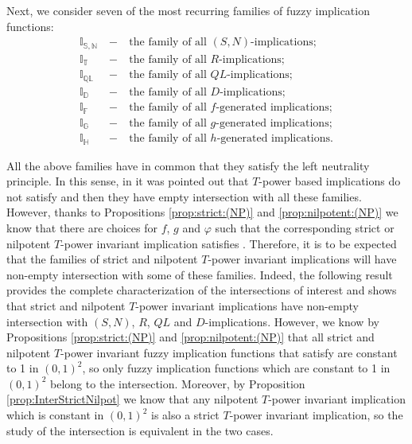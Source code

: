 Next, we consider seven of the most recurring families of fuzzy implication functions:
\begin{eqnarray*}
	\mathbb{I}_{\mathbb{S},\mathbb{N}} &~-~& \text{the family of all $(S,N)$-implications};\\
	\mathbb{I}_{\mathbb{T}} &~-~& \text{the family of all $R$-implications};\\
	\mathbb{I}_{\mathbb{QL}} &~-~& \text{the family of all $QL$-implications};\\
	\mathbb{I}_{\mathbb{D}} &~-~& \text{the family of all $D$-implications};\\
	\mathbb{I}_{\mathbb{F}} &~-~& \text{the family of all $f$-generated implications};\\
	\mathbb{I}_{\mathbb{G}} &~-~& \text{the family of all $g$-generated implications};\\
	\mathbb{I}_{\mathbb{H}} &~-~& \text{the family of all $h$-generated implications}.
\end{eqnarray*}

All the above families have in common that they satisfy the left neutrality principle. In this sense, in \cite{Massanet2017} it was pointed out that $T$-power based implications do not satisfy \NP and then they have empty intersection with all these families. However, thanks to Propositions \ref{prop:strict:(NP)} and \ref{prop:nilpotent:(NP)} we know that there are choices for $f$, $g$ and $\varphi$ such that the corresponding strict or nilpotent $T$-power invariant implication satisfies \NP. Therefore, it is to be expected that the families of strict and nilpotent $T$-power invariant implications will have non-empty intersection with some of these families.  Indeed, the following result provides the complete characterization of the intersections of interest and shows that strict and nilpotent $T$-power invariant implications have non-empty intersection with $(S,N)$, $R$, $QL$ and $D$-implications. However, we know by Propositions \ref{prop:strict:(NP)} and \ref{prop:nilpotent:(NP)} that all strict and nilpotent $T$-power invariant fuzzy implication functions that satisfy \NP are constant to 1 in $(0,1)^2$, so only fuzzy implication functions which are constant to 1 in $(0,1)^2$ belong to the intersection. Moreover, by Proposition \ref{prop:InterStrictNilpot} we know that any nilpotent $T$-power invariant implication which is constant in $(0,1)^2$ is also a strict $T$-power invariant implication, so the study of the intersection is equivalent in the two cases.

